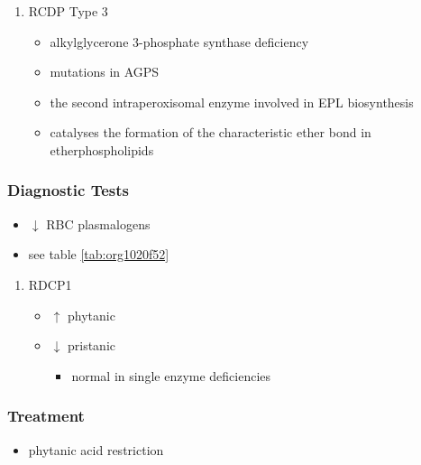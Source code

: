 \documentclass[12pt]{scrartcl}
\begin{document}
\begin{enumerate}
\item RCDP Type 3
\label{sec:org8242d91}
\begin{itemize}
\item alkylglycerone 3-phosphate synthase deficiency
\item mutations in AGPS
\item the second intraperoxisomal enzyme involved in EPL biosynthesis
\item catalyses the formation of the characteristic ether bond in etherphospholipids
\end{itemize}
\end{enumerate}

\subsubsection{Diagnostic Tests}
\label{sec:orgb2df973}
\begin{itemize}
\item \(\downarrow\) RBC plasmalogens
\item see table \ref{tab:org1020f52}
\end{itemize}
\begin{enumerate}
\item RDCP1
\label{sec:orgb8d2c0b}
\begin{itemize}
\item \(\uparrow\) phytanic
\item \(\downarrow\) pristanic
\begin{itemize}
\item normal in single enzyme deficiencies
\end{itemize}
\end{itemize}
\end{enumerate}

\subsubsection{Treatment}
\label{sec:org8fb24ae}
\begin{itemize}
\item phytanic acid restriction
\end{itemize}
\end{document}
